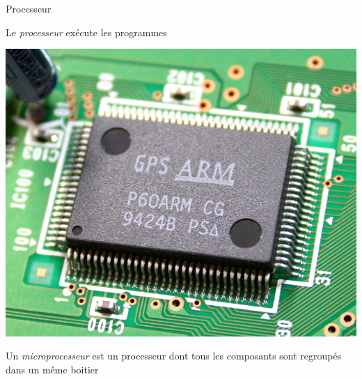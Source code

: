 \documentclass[14pt,xcolor,table]{beamer}
\begin{document}
\begin{frame}[fragile]{Processeur}
	
	Le \emph{processeur} exécute les programmes
	

	\begin{center}
	\includegraphics[width=.4\textwidth]{images/cpu-arm60}
	\end{center}
	
	Un \emph{microprocesseur} est un processeur dont tous les
	composants sont regroupés dans un même boitier
	
\end{frame}
\end{document}
